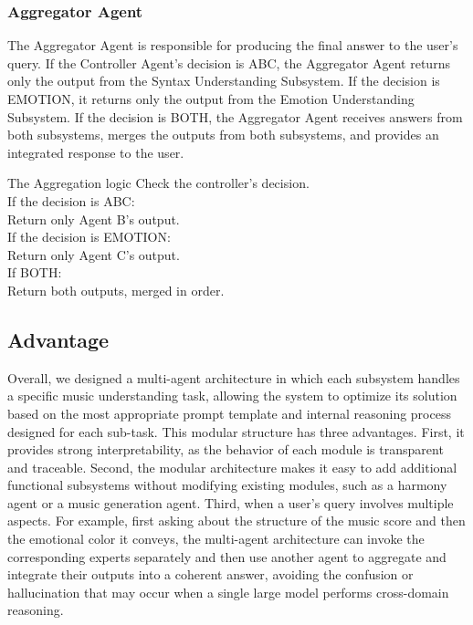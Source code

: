 \documentclass[sigconf]{acmart}
\begin{document}
\subsubsection{Aggregator Agent}
The Aggregator Agent is responsible for producing the final answer to the user’s query. 
If the Controller Agent’s decision is ABC, the Aggregator Agent returns only the output from the Syntax Understanding Subsystem.
If the decision is EMOTION, it returns only the output from the Emotion Understanding Subsystem.
If the decision is BOTH, the Aggregator Agent receives answers from both subsystems, merges the outputs from both subsystems, and provides an integrated response to the user.

\begin{promptbox}{The Aggregation logic}
Check the controller's decision. \\ 

If the decision is ABC:\\
    Return only Agent B's output.\\

If the decision is EMOTION:\\
    Return only Agent C's output.\\

If BOTH:\\
    Return both outputs, merged in order.\\
\end{promptbox}

\subsection{Advantage}
Overall, we designed a multi-agent architecture in which each subsystem handles a specific music understanding task, allowing the system to optimize its solution based on the most appropriate prompt template and internal reasoning process designed for each sub-task. This modular structure has three advantages. First, it provides strong interpretability, as the behavior of each module is transparent and traceable. Second, the modular architecture makes it easy to add additional functional subsystems without modifying existing modules, such as a harmony agent or a music generation agent. Third, when a user’s query involves multiple aspects. For example, first asking about the structure of the music score and then the emotional color it conveys, the multi-agent architecture can invoke the corresponding experts separately and then use another agent to aggregate and integrate their outputs into a coherent answer, avoiding the confusion or hallucination that may occur when a single large model performs cross-domain reasoning.
\end{document}
